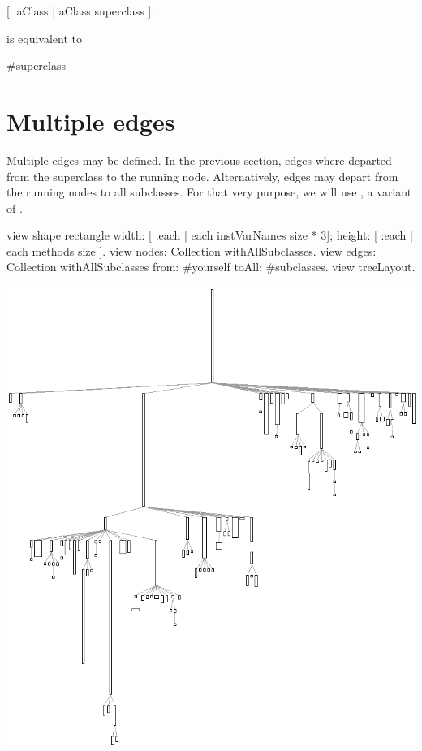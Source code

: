 \documentclass[a4paper,10pt,twoside]{book}
\begin{document}
\begin{code}{}
[ :aClass | aClass superclass ].
\end{code}

is equivalent to
\begin{code}{}
#superclass
\end{code}

\section{Multiple edges}
Multiple edges may be defined. In the previous section, edges where departed from the superclass to the running node. Alternatively, edges may depart from the running nodes to all subclasses. For that very purpose, we will use , a variant of .

\begin{code}{}
view shape rectangle
  width: [ :each | each instVarNames size * 3];
  height: [ :each | each methods size ].
view nodes: Collection withAllSubclasses.
view edges: Collection withAllSubclasses from: #yourself toAll: #subclasses.
view treeLayout.
\end{code}
\begin{center}\includegraphics[scale=0.4]{picture6}\end{center}
\end{document}

